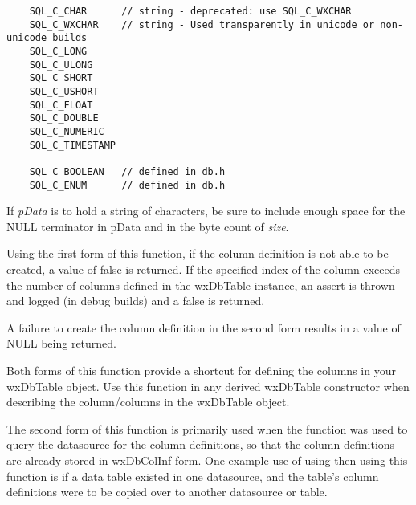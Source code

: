 \begin{verbatim}
    SQL_C_CHAR      // string - deprecated: use SQL_C_WXCHAR
    SQL_C_WXCHAR    // string - Used transparently in unicode or non-unicode builds
    SQL_C_LONG
    SQL_C_ULONG
    SQL_C_SHORT
    SQL_C_USHORT
    SQL_C_FLOAT
    SQL_C_DOUBLE
    SQL_C_NUMERIC
    SQL_C_TIMESTAMP

    SQL_C_BOOLEAN   // defined in db.h
    SQL_C_ENUM      // defined in db.h
\end{verbatim}




If {\it pData} is to hold a string of characters, be sure to include enough
space for the NULL terminator in pData and in the byte count of {\it size}.

Using the first form of this function, if the column definition is not able 
to be created, a value of false is returned.  If the specified index of the 
column exceeds the number of columns defined in the wxDbTable instance, an
assert is thrown and logged (in debug builds) and a false is returned.

A failure to create the column definition in the second form results in a 
value of NULL being returned.

Both forms of this function provide a shortcut for defining the columns in
your wxDbTable object.  Use this function in any derived wxDbTable
constructor when describing the column/columns in the wxDbTable object.

The second form of this function is primarily used when the
 function was used to query the
datasource for the column definitions, so that the column definitions are
already stored in wxDbColInf form.  One example use of using
 then using this function is if
a data table existed in one datasource, and the table's column definitions
were to be copied over to another datasource or table.

